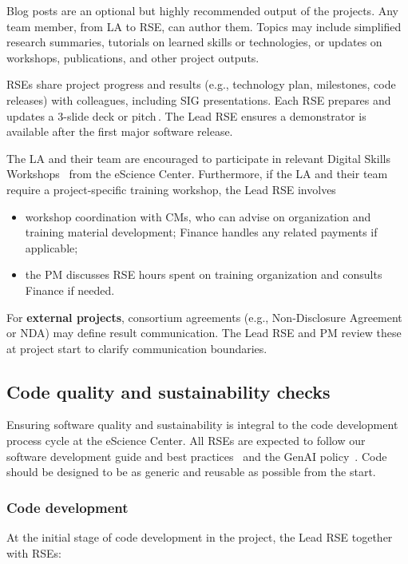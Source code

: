 Blog posts are an optional but highly recommended output of the projects. Any team member, from LA to RSE, can author them. 
Topics may include simplified research summaries, tutorials on learned skills or technologies, or updates on workshops, publications, and other project outputs.

RSEs share project progress and results (e.g., technology plan, milestones, code releases) with colleagues, 
including SIG presentations. Each RSE prepares and updates a 3-slide deck or pitch \cite{proj-portfolio}. 
The Lead RSE ensures a demonstrator is available after the first major software release.


The LA and their team are encouraged to participate in relevant Digital Skills Workshops~\cite{digital-skills} from the eScience Center. Furthermore, if the LA and their team
require a project-specific training workshop, the Lead RSE involves
\begin{itemize}
\item workshop coordination with CMs, who can advise on organization and training material development; Finance handles any related payments if applicable;
\item the PM discusses RSE hours spent on training organization and consults Finance if needed.
\end{itemize}

For \textbf{external projects}, consortium agreements (e.g., Non-Disclosure Agreement or NDA) may define result communication. The Lead RSE and PM review these at project start to clarify communication boundaries.

\subsection{Code quality and sustainability checks}
Ensuring software quality and sustainability is integral to the code development process cycle at the eScience
Center. All RSEs are expected to follow our software development guide and best practices~\cite{guide-nlesc} and the GenAI policy~\cite{nlesc2023genai}. Code should be 
designed to be as generic and reusable as possible from the start.

\subsubsection{Code development}
\label{sec:exec:code}
At the initial stage of code development in the project, the Lead RSE together with RSEs:

